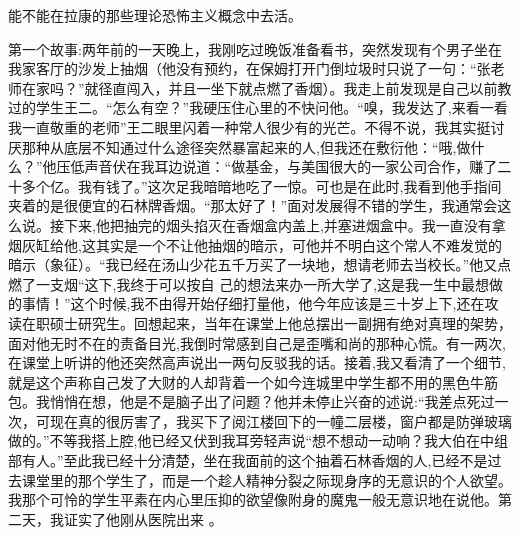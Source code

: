 \documentclass{article}
\begin{document}
\newpage
能不能在拉康的那些理论恐怖主义概念中去活。 

第一个故事:两年前的一天晚上，我刚吃过晚饭准备看书，突然发现有个男子坐在我家客厅的沙发上抽烟（他没有预约，在保姆打开门倒垃圾时只说了一句：“张老师在家吗？”就径直闯入，并且一坐下就点燃了香烟）。我走上前发现是自己以前教过的学生王二。“怎么有空？”我硬压住心里的不快问他。“嗅，我发达了,来看一看我一直敬重的老师”王二眼里闪着一种常人很少有的光芒。不得不说，我其实挺讨厌那种从底层不知通过什么途径突然暴富起来的人,但我还在敷衍他：“哦,做什么？”他压低声音伏在我耳边说道：“做基金，与美国很大的一家公司合作，赚了二十多个亿。我有钱了。”这次足我暗暗地吃了一惊。可也是在此时,我看到他手指间夹着的是很便宜的石林牌香烟。“那太好了！”面对发展得不错的学生，我通常会这么说。接下来,他把抽完的烟头掐灭在香烟盒内盖上,并塞进烟盒中。我一直没有拿烟灰缸给他,这其实是一个不让他抽烟的暗示，可他并不明白这个常人不难发觉的暗示（象征）。“我已经在汤山少花五千万买了一块地，想请老师去当校长。”他又点燃了一支烟“这下,我终于可以按自
\newpage
己的想法来办一所大学了,这是我一生中最想做的事情！”这个时候,我不由得开始仔细打量他，他今年应该是三十岁上下,还在攻读在职硕士研究生。回想起来，当年在课堂上他总摆出一副拥有绝对真理的架势，面对他无时不在的责备目光,我倒时常感到自己是歪嘴和尚的那种心慌。有一两次,在课堂上听讲的他还突然高声说出一两句反驳我的话。接着,我又看清了一个细节,就是这个声称自己发了大财的人却背着一个如今连城里中学生都不用的黑色牛筋包。我悄悄在想，他是不是脑子出了问题？他并未停止兴奋的述说:“我差点死过一次，可现在真的很厉害了，我买下了阅江楼回下的一幢二层楼，窗户都是防弹玻璃做的。”不等我搭上腔,他已经又伏到我耳旁轻声说“想不想动一动响？我大伯在中组部有人。”至此我已经十分清楚，坐在我面前的这个抽着石林香烟的人,已经不是过去课堂里的那个学生了，而是一个趁人精神分裂之际现身序的无意识的个人欲望。我那个可怜的学生平素在内心里压抑的欲望像附身的魔鬼一般无意识地在说他。第二天，我证实了他刚从医院出来
。 

\newpage
\end{document}
